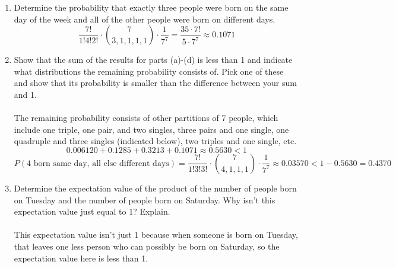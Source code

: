 \documentclass{article}
\begin{document}
\begin{enumerate}
\begin{enumerate}
        \\
        \[\frac{7!}{2!2!3!} \cdot \binom{7}{2,2,1,1,1} \cdot \frac{1}{7^7} = \frac{210 \cdot 7!}{4\cdot 7^7} \approx \boxed{0.3213} \]
        \item Determine the probability that exactly three people were born on the same day of the week and all of the other people were born on different days.
        \\
        \[\frac{7!}{1!4!2!} \cdot \binom{7}{3,1,1,1,1} \cdot \frac{1}{7^7} = \frac{35 \cdot 7!}{5 \cdot 7^7} \approx \boxed{0.1071}\]
        \item Show that the sum of the results for parts (a)-(d) is less than 1 and indicate what distributions the remaining probability consists of. Pick one of these and show that its probability is smaller than the difference between your sum and 1.
        \\
        \\ The remaining probability consists of other partitions of 7 people, which include one triple, one pair, and two singles, three pairs and one single, one quadruple and three singles (indicated below), two triples and one single, etc.
        \[0.006120 + 0.1285 + 0.3213 + 0.1071 \approx 0.5630 < 1\]
        \[P(\text{4 born same day, all else different days}) = \frac{7!}{1!3!3!}\cdot\binom{7}{4,1,1,1}\cdot\frac{1}{7^{7}} \approx \boxed{0.03570} < 1 - 0.5630 = 0.4370\]
        \item Determine the expectation value of the product of the number of people born on Tuesday and the number of people born on Saturday. Why isn't this expectation value just equal to 1? Explain.
        \\\\This expectation value isn't just 1 because when someone is born on Tuesday, that leaves one less person who can possibly be born on Saturday, so the expectation value here is less than 1.
    \end{enumerate}
\end{enumerate}
\end{document}

